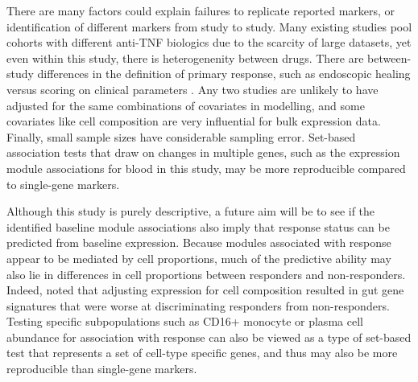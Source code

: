 There are many factors could explain failures to replicate reported markers, or identification of different markers from study to study.
Many existing studies pool cohorts with different anti-\gls{TNF} biologics due to the scarcity of large datasets,
yet even within this study, there is heterogenenity between drugs.
There are between-study differences in the definition of primary response,
such as endoscopic healing \autocite{gaujoux2019CellcentredMetaanalysisReveals} versus scoring on clinical parameters \autocite{verstockt2019LowTREM1Expression}.
Any two studies are unlikely to have adjusted for the same combinations of covariates in modelling,
and some covariates like cell composition are very influential for bulk expression data.
Finally, small sample sizes have considerable sampling error.
Set-based association tests that draw on changes in multiple genes,
such as the expression module associations for blood in this study,
may be more reproducible compared to single-gene markers. 

Although this study is purely descriptive, a future aim will be to see if the identified baseline module associations also imply that response status can be predicted from baseline expression.
Because modules associated with response appear to be mediated by cell proportions,
much of the predictive ability may also lie in differences in cell proportions between responders and non-responders.
Indeed, \textcite{gaujoux2019CellcentredMetaanalysisReveals} noted that adjusting expression for cell composition resulted in gut gene signatures that were worse at discriminating responders from non-responders.
Testing specific subpopulations such as CD16+ monocyte or plasma cell abundance for association with response
can also be viewed as a type of set-based test that represents a set of cell-type specific genes,
and thus may also be more reproducible than single-gene markers.

